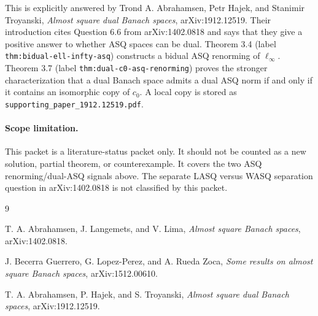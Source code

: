 \documentclass[11pt]{article}
\begin{document}
This is explicitly answered by Trond A. Abrahamsen, Petr Hajek, and Stanimir
Troyanski, \emph{Almost square dual Banach spaces}, arXiv:1912.12519. Their
introduction cites Question 6.6 from arXiv:1402.0818 and says that they give a
positive answer to whether ASQ spaces can be dual. Theorem 3.4 (label
\texttt{thm:bidual-ell-infty-asq}) constructs a bidual ASQ renorming of
$\ell_\infty$. Theorem 3.7 (label
\texttt{thm:dual-c0-asq-renorming}) proves the stronger characterization that
a dual Banach space admits a dual ASQ norm if and only if it contains an
isomorphic copy of $c_0$. A local copy is stored as
\texttt{supporting\_paper\_1912.12519.pdf}.

\paragraph{Scope limitation.}
This packet is a literature-status packet only. It should not be counted as a
new solution, partial theorem, or counterexample. It covers the two ASQ
renorming/dual-ASQ signals above. The separate LASQ versus WASQ separation
question in arXiv:1402.0818 is not classified by this packet.

\begin{thebibliography}{9}

T. A. Abrahamsen, J. Langemets, and V. Lima,
\emph{Almost square Banach spaces}, arXiv:1402.0818.

J. Becerra Guerrero, G. Lopez-Perez, and A. Rueda Zoca,
\emph{Some results on almost square Banach spaces}, arXiv:1512.00610.

T. A. Abrahamsen, P. Hajek, and S. Troyanski,
\emph{Almost square dual Banach spaces}, arXiv:1912.12519.

\end{thebibliography}
\end{document}
